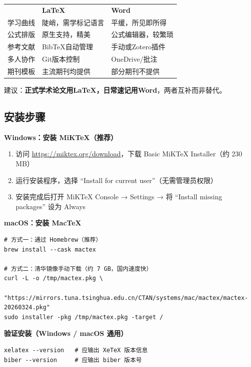 \begin{theorybox}
\begin{tabular}{lll}
 & \textbf{LaTeX} & \textbf{Word} \\
学习曲线 & 陡峭，需学标记语言 & 平缓，所见即所得 \\
公式排版 & 原生支持，精美 & 公式编辑器，较繁琐 \\
参考文献 & BibTeX自动管理 & 手动或Zotero插件 \\
多人协作 & Git版本控制 & OneDrive/批注 \\
期刊模板 & 主流期刊均提供 & 部分期刊不提供 \\
\end{tabular}

建议：\textbf{正式学术论文用LaTeX，日常速记用Word}，两者互补而非替代。
\end{theorybox}

\subsection{安装步骤}

\textbf{Windows：安装 MiKTeX（推荐）}

\begin{enumerate}[leftmargin=2em]
  \item 访问 \url{https://miktex.org/download}，下载 Basic MiKTeX Installer（约 230 MB）
  \item 运行安装程序，选择 ``Install for current user''（无需管理员权限）
  \item 安装完成后打开 MiKTeX Console → Settings → 将 ``Install missing packages'' 设为 Always
\end{enumerate}

\textbf{macOS：安装 MacTeX}

\begin{lstlisting}[style=shell]
# 方式一：通过 Homebrew（推荐）
brew install --cask mactex

# 方式二：清华镜像手动下载（约 7 GB，国内速度快）
curl -L -o /tmp/mactex.pkg \
  "https://mirrors.tuna.tsinghua.edu.cn/CTAN/systems/mac/mactex/mactex-20260324.pkg"
sudo installer -pkg /tmp/mactex.pkg -target /
\end{lstlisting}

\textbf{验证安装（Windows / macOS 通用）}

\begin{lstlisting}[style=shell]
xelatex --version   # 应输出 XeTeX 版本信息
biber --version     # 应输出 biber 版本号
\end{lstlisting}

